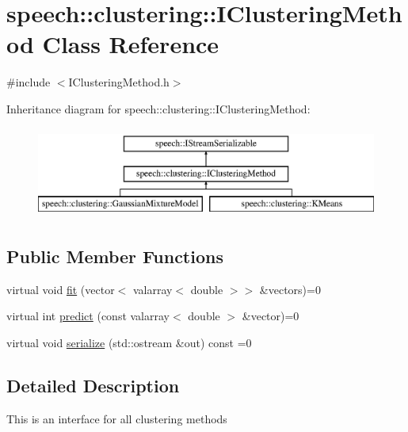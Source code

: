 \hypertarget{classspeech_1_1clustering_1_1IClusteringMethod}{\section{speech\+:\+:clustering\+:\+:I\+Clustering\+Method Class Reference}
\label{classspeech_1_1clustering_1_1IClusteringMethod}
}


{\ttfamily \#include $<$I\+Clustering\+Method.\+h$>$}

Inheritance diagram for speech\+:\+:clustering\+:\+:I\+Clustering\+Method\+:\begin{figure}[H]
\begin{center}
\leavevmode
\includegraphics[height=3.000000cm]{classspeech_1_1clustering_1_1IClusteringMethod}
\end{center}
\end{figure}
\subsection*{Public Member Functions}
\begin{DoxyCompactItemize}
\item 
virtual void \hyperlink{classspeech_1_1clustering_1_1IClusteringMethod_ab9ec001a1f76be4793086cd8548ac886}{fit} (vector$<$ valarray$<$ double $>$$>$ \&vectors)=0
\item 
virtual int \hyperlink{classspeech_1_1clustering_1_1IClusteringMethod_a47be2ed9fbe6792dcebc8fdcee7fa76e}{predict} (const valarray$<$ double $>$ \&vector)=0
\item 
virtual void \hyperlink{classspeech_1_1clustering_1_1IClusteringMethod_a9676e73a7c47d5383e9359850086249c}{serialize} (std\+::ostream \&out) const =0
\end{DoxyCompactItemize}


\subsection{Detailed Description}
This is an interface for all clustering methods 

